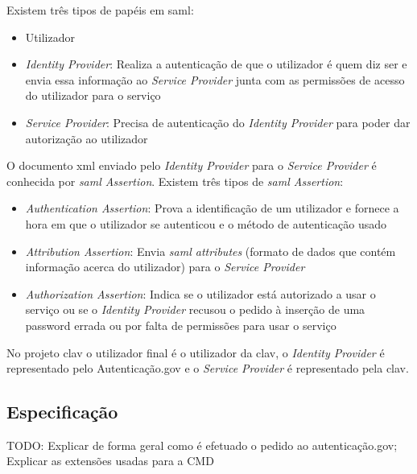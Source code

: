 Existem três tipos de papéis em \acrshort{saml}:~\cite{wisaml}
\begin{itemize}[leftmargin=2cm]
    \item Utilizador
    \item \textit{Identity Provider}: Realiza a autenticação de que o utilizador é quem diz ser e envia essa informação ao \textit{Service Provider} junta com as permissões de acesso do utilizador para o serviço
    \item \textit{Service Provider}: Precisa de autenticação do \textit{Identity Provider} para poder dar autorização ao utilizador
\end{itemize}

O documento \acrshort{xml} enviado pelo \textit{Identity Provider} para o \textit{Service Provider} é conhecida por \textit{\acrshort{saml} Assertion}. Existem três tipos de \textit{\acrshort{saml} Assertion}:~\cite{wisaml}
\begin{itemize}[leftmargin=2cm]
    \item \textit{Authentication Assertion}: Prova a identificação de um utilizador e fornece a hora em que o utilizador se autenticou e o método de autenticação usado
    \item \textit{Attribution Assertion}: Envia \textit{\acrshort{saml} attributes} (formato de dados que contém informação acerca do utilizador) para o \textit{Service Provider}
    \item \textit{Authorization Assertion}: Indica se o utilizador está autorizado a usar o serviço ou se o \textit{Identity Provider} recusou o pedido à inserção de uma password errada ou por falta de permissões para usar o serviço
\end{itemize}

No projeto \acrshort{clav} o utilizador final é o utilizador da \acrshort{clav}, o \textit{Identity Provider} é representado pelo Autenticação.gov e o \textit{Service Provider} é representado pela \acrshort{clav}.

\subsection{Especificação}
TODO: Explicar de forma geral como é efetuado o pedido ao autenticação.gov; Explicar as extensões usadas para a CMD


